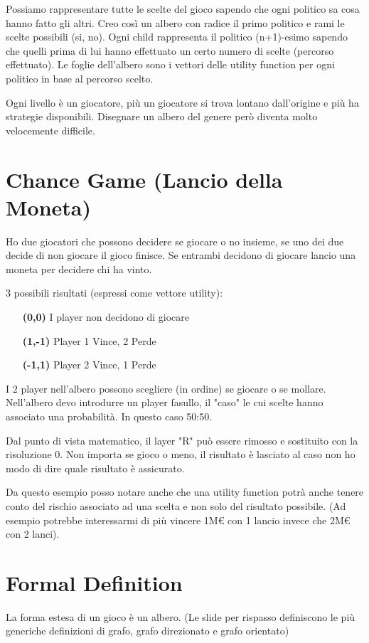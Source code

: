 \documentclass[10pt,a4paper]{report}
\begin{document}
        Possiamo rappresentare tutte le scelte del gioco sapendo che ogni politico sa cosa hanno fatto gli altri.
        Creo così un albero con radice il primo politico e rami le scelte possibili (si, no). Ogni child rappresenta il politico (n+1)-esimo sapendo che quelli prima di lui hanno effettuato un certo numero di scelte (percorso effettuato).
        Le foglie dell'albero sono i vettori delle utility function per ogni politico in base al percorso scelto.

        Ogni livello è un giocatore, più un giocatore si trova lontano dall'origine e più ha strategie disponibili.
        Disegnare un albero del genere però diventa molto velocemente difficile.

        \section{Chance Game (Lancio della Moneta)}
        Ho due giocatori che possono decidere se giocare o no insieme, se uno dei due decide di non giocare il gioco finisce.
        Se entrambi decidono di giocare lancio una moneta per decidere chi ha vinto.

        3 possibili risultati (espressi come vettore utility):
        \begin{itemize}
            \item[\textbf{(0,0)}] I player non decidono di giocare
            \item[\textbf{(1,-1)}] Player 1 Vince, 2 Perde
            \item[\textbf{(-1,1)}] Player 2 Vince, 1 Perde
        \end{itemize}
        I 2 player nell'albero possono scegliere (in ordine) se giocare o se mollare.
        Nell'albero devo introdurre un player fasullo, il "caso" le cui scelte hanno associato una probabilità. In questo caso 50:50.

        Dal punto di vista matematico, il layer "R" può essere rimosso e sostituito con la risoluzione 0. Non importa se gioco o meno, il risultato è lasciato al caso non ho modo di dire quale risultato è assicurato.

        Da questo esempio posso notare anche che una utility function potrà anche tenere conto del rischio associato ad una scelta e non solo del risultato possibile. (Ad esempio potrebbe interessarmi di più vincere 1M€ con 1 lancio invece che 2M€ con 2 lanci).

        \section{Formal Definition}
        La forma estesa di un gioco è un albero. (Le slide per rispasso definiscono le più generiche definizioni di grafo, grafo direzionato e grafo orientato)
        
\end{document}
